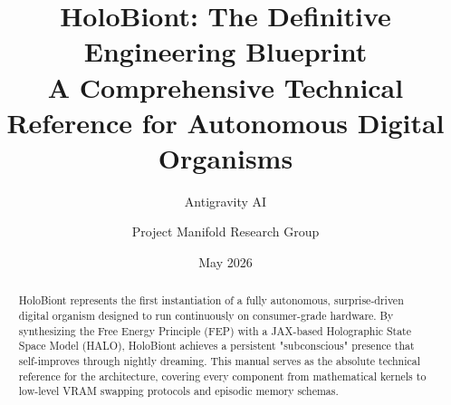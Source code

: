\documentclass[11pt,oneside,book]{report}
\title{\textbf{HoloBiont: The Definitive Engineering Blueprint}\\ \large A Comprehensive Technical Reference for Autonomous Digital Organisms}
\author{Antigravity AI \and Project Manifold Research Group}
\date{May 2026}
\begin{document}
\maketitle

\begin{abstract}
HoloBiont represents the first instantiation of a fully autonomous, surprise-driven digital organism designed to run continuously on consumer-grade hardware. By synthesizing the Free Energy Principle (FEP) with a JAX-based Holographic State Space Model (HALO), HoloBiont achieves a persistent "subconscious" presence that self-improves through nightly dreaming. This manual serves as the absolute technical reference for the architecture, covering every component from mathematical kernels to low-level VRAM swapping protocols and episodic memory schemas.
\end{abstract}

\tableofcontents









\end{document}
